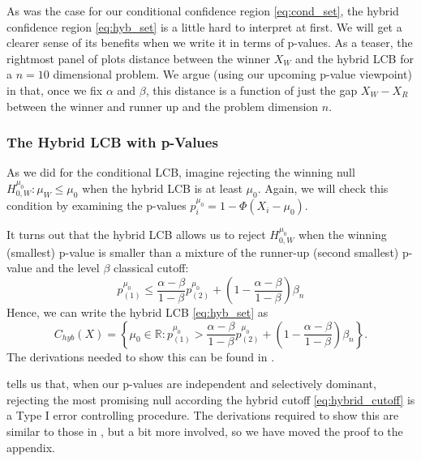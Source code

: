 \documentclass{article}
\newcommand{\R}{\mathbb{R}}
\begin{document}
As was the case for our conditional confidence region \eqref{eq:cond_set}, the hybrid confidence region \eqref{eq:hyb_set} is a little hard to interpret at first. We will get a clearer sense of its benefits when we write it in terms of p-values. As a teaser, the rightmost panel of  plots distance between the winner $X_W$ and the hybrid LCB for a $n=10$ dimensional problem. We argue (using our upcoming p-value viewpoint) in  that, once we fix $\alpha$ and $\beta$, this distance is a function of just the gap $X_W - X_R$ between the winner and runner up and the problem dimension $n$. 

\subsubsection{The Hybrid LCB with p-Values}

As we did for the conditional LCB, imagine rejecting the winning null $H^{\mu_0}_{0, W}: \mu_{W} \leq \mu_0$ when the hybrid LCB is at least $\mu_0$. Again, we will check this condition by examining the p-values $p^{\mu_0}_i = 1- \Phi(X_i - \mu_0)$.  

It turns out that the hybrid LCB allows us to reject $H_{0, W}^{\mu_0}$ when the winning (smallest) p-value is smaller than a mixture of the runner-up (second smallest) p-value and the level $\beta$ classical cutoff:
\begin{equation}
\label{eq:hybrid_cutoff}
    p^{\mu_0}_{(1)}\leq \frac{\alpha-\beta}{1-\beta}p^{\mu_0}_{(2)}  + \left(1 - \frac{\alpha - \beta}{1 - \beta}\right)\beta_n
\end{equation}
Hence, we can write the hybrid LCB \eqref{eq:hyb_set} as 
\begin{equation}
    \label{eq:hyb_set_p_val}
        C_{hyb}(X) = \left\{ \mu_0 \in \R:  p^{\mu_0}_{(1)} > \frac{\alpha-\beta}{1-\beta}p^{\mu_0}_{(2)}  + \left(1 - \frac{\alpha - \beta}{1 - \beta}\right) \beta_n \right\}. 
\end{equation}
The derivations needed to show this can be found in . 

 tells us that, when our p-values are independent and selectively dominant, rejecting the most promising null according the hybrid cutoff \eqref{eq:hybrid_cutoff} is a Type I error controlling procedure. The derivations required to show this are similar to those in , but a bit more involved, so we have moved the proof to the appendix. 
\end{document}
